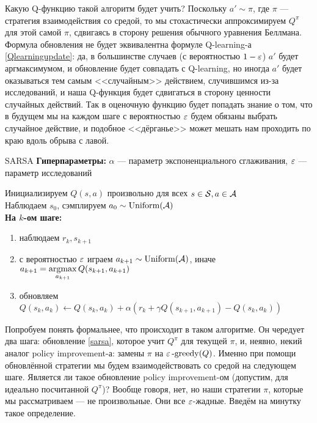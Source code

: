 Какую Q-функцию такой алгоритм будет учить? Поскольку $a' \sim \pi$, где $\pi$ --- стратегия взаимодействия со средой, то мы стохастически аппроксимируем $Q^{\pi}$ для этой самой $\pi$, сдвигаясь в сторону решения обычного уравнения Беллмана. Формула обновления не будет эквивалентна формуле Q-learning-а \eqref{Qlearningupdate}: да, в большинстве случаев (с вероятностью $1 \HM- \eps$) $a'$ будет аргмаксимумом, и обновление будет совпадать с Q-learning, но иногда $a'$ будет оказываться тем самым <<случайным>> действием, случившимся из-за исследований, и наша Q-функция будет сдвигаться в сторону ценности случайных действий. Так в оценочную функцию будет попадать знание о том, что в будущем мы на каждом шаге с вероятностью $\varepsilon$ будем обязаны выбрать случайное действие, и подобное <<дёрганье>> может мешать нам проходить по краю вдоль обрыва с лавой.

\begin{algorithm}{SARSA}
\textbf{Гиперпараметры:} $\alpha$ --- параметр экспоненциального сглаживания, $\varepsilon$ --- параметр исследований

\vspace{0.3cm}
Инициализируем $Q(s, a)$ произвольно для всех $s \in \mathcal{S}, a \in \mathcal{A}$ \\
Наблюдаем $s_0$, сэмплируем $a_0 \sim \operatorname{Uniform}(\mathcal{A})$ \\
\textbf{На $k$-ом шаге:}
\begin{enumerate}
    \item наблюдаем $r_k, s_{k+1}$
    \item с вероятностью $\varepsilon$ играем $a_{k+1} \sim \operatorname{Uniform}(\mathcal{A})$, иначе $a_{k+1} = \mathop{\mathrm{argmax}}\limits_{a_{k+1}} Q(s_{k+1}, a_{k+1})$
    \item обновляем $Q(s_k, a_k) \leftarrow Q(s_k, a_k) + \alpha \left( r_k + \gamma Q(s_{k+1}, a_{k+1}) - Q(s_k, a_k) \right)$
\end{enumerate}
\end{algorithm}

Попробуем понять формальнее, что происходит в таком алгоритме. Он чередует два шага: обновление \eqref{sarsa}, которое учит $Q^{\pi}$ для текущей $\pi$, и, неявно, некий аналог policy improvement-а: замены $\pi$ на $\varepsilon\operatorname{-greedy}(Q)$. Именно при помощи обновлённой стратегии мы будем взаимодействовать со средой на следующем шаге. Является ли такое обновление policy improvement-ом (допустим, для идеально посчитанной $Q^\pi$)? Вообще говоря, нет, но наши стратегии $\pi$, которые мы рассматриваем --- не произвольные. Они все $\varepsilon$-жадные. Введём на минутку такое определение.

